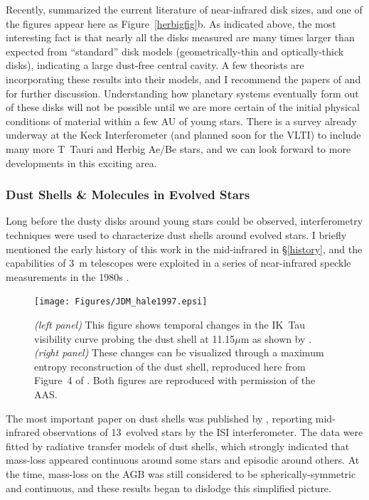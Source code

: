 \documentclass[12pt]{iopart}
\begin{document}
Recently, \citet{monnier2002a} summarized the current literature of
near-infrared disk sizes, and one of the figures appear here as
Figure~\ref{herbigfig}b. As indicated above, the most interesting fact
is that nearly all the disks measured are many times larger than
expected from ``standard'' disk models (geometrically-thin and
optically-thick disks), indicating a large dust-free central cavity.
A few theorists are incorporating these results into their models, and
I recommend the papers of 
\citet{natta2001} and \citet{dullemond2001} for further discussion.
Understanding how planetary systems eventually form out of
these disks will not be possible until we are more certain of the
initial physical conditions of material within a few AU of young
stars.  There is a survey already underway at the Keck Interferometer
(and planned soon for the VLTI) to include many more T~Tauri and
Herbig Ae/Be stars, and we can look forward to more developments in
this exciting area.

\subsubsection{Dust Shells \& Molecules in Evolved Stars}
Long before the dusty disks around young stars could be observed,
interferometry techniques were used to characterize dust shells
around evolved stars.  I briefly mentioned the early history of this
work in the mid-infrared in \S\ref{history}, and the capabilities
of 3~m telescopes were exploited in a series of near-infrared
speckle measurements in the 1980s \citep[see especially][]{dyck1984}.

\begin{figure}[tbhp]
\begin{center}
\texttt{[image: Figures/JDM\_hale1997.epsi]}
\caption{\footnotesize {\em (left panel)} This figure shows temporal 
  changes in the IK~Tau visibility curve probing the dust shell at
  11.15$\mu$m as shown by \citet[][Figure~3]{hale1997}.  {\em (right
    panel)} These changes can be visualized through a maximum entropy
  reconstruction of the dust shell, reproduced here from Figure~4 of
  \citet{hale1997}. Both figures are reproduced with permission of the
  AAS.
\label{hale1997}}
\end{center}
\end{figure}

The most important paper on dust shells was published by
\citet{danchi1994}, reporting mid-infrared observations of 13~evolved
stars by the ISI interferometer.  The data were fitted by radiative
transfer models of dust shells, which strongly indicated that
mass-loss appeared continuous around some stars and episodic around
others.  At the time, mass-loss on the AGB was still considered to be
spherically-symmetric and continuous, and these results began to
dislodge this simplified picture.
\end{document}
